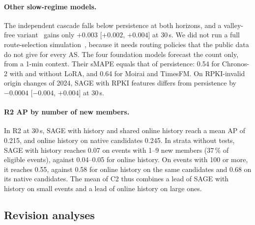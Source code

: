 \paragraph{Other slow-regime models.}
The independent cascade falls below persistence at both horizons, and a valley-free variant~\cite{gao2001relationships} gains only $+0.003$ [$+0.002$, $+0.004$] at 30\,s.
We did not run a full route-selection simulation~\cite{furuness2023}, because it needs routing policies that the public data do not give for every AS.
The four foundation models forecast the count only, from a 1-min context.
Their sMAPE equals that of persistence: 0.54 for Chronos-2 with and without LoRA, and 0.64 for Moirai and TimesFM.
On RPKI-invalid origin changes of 2024, SAGE with RPKI features differs from persistence by $-0.0004$ [$-0.004$, $+0.004$] at 30\,s.

\paragraph{R2 AP by number of new members.}
In R2 at 30\,s, SAGE with history and shared online history reach a mean AP of 0.215, and online history on native candidates 0.245.
In strata without tests, SAGE with history reaches 0.07 on events with 1--9 new members (37\,\% of eligible events), against 0.04--0.05 for online history.
On events with 100 or more, it reaches 0.55, against 0.58 for online history on the same candidates and 0.68 on its native candidates.
The mean of C2 thus combines a lead of SAGE with history on small events and a lead of online history on large ones.

\subsection{Revision analyses}
